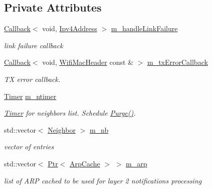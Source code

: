 \subsection*{Private Attributes}
\begin{DoxyCompactItemize}
\item 
\hyperlink{classns3_1_1Callback}{Callback}$<$ void, \hyperlink{classns3_1_1Ipv4Address}{Ipv4\+Address} $>$ \hyperlink{classns3_1_1aodv_1_1Neighbors_a9f8078f57932255c9fc05f6f3bcef8ab}{m\+\_\+handle\+Link\+Failure}
\begin{DoxyCompactList}\small\item\em link failure callback \end{DoxyCompactList}\item 
\hyperlink{classns3_1_1Callback}{Callback}$<$ void, \hyperlink{classns3_1_1WifiMacHeader}{Wifi\+Mac\+Header} const \& $>$ \hyperlink{classns3_1_1aodv_1_1Neighbors_ab0ff33bad83facfa8a2da7d932bd9953}{m\+\_\+tx\+Error\+Callback}
\begin{DoxyCompactList}\small\item\em TX error callback. \end{DoxyCompactList}\item 
\hyperlink{classns3_1_1Timer}{Timer} \hyperlink{classns3_1_1aodv_1_1Neighbors_a94dd235d692b8ff312b51654580530cd}{m\+\_\+ntimer}
\begin{DoxyCompactList}\small\item\em \hyperlink{classns3_1_1Timer}{Timer} for neighbor\textquotesingle{}s list. Schedule \hyperlink{classns3_1_1aodv_1_1Neighbors_a5db1238b20a700967e21ebb3522afc5c}{Purge()}. \end{DoxyCompactList}\item 
std\+::vector$<$ \hyperlink{structns3_1_1aodv_1_1Neighbors_1_1Neighbor}{Neighbor} $>$ \hyperlink{classns3_1_1aodv_1_1Neighbors_a885bb3a178f3583ed73e391d918f2f63}{m\+\_\+nb}
\begin{DoxyCompactList}\small\item\em vector of entries \end{DoxyCompactList}\item 
std\+::vector$<$ \hyperlink{classns3_1_1Ptr}{Ptr}$<$ \hyperlink{classns3_1_1ArpCache}{Arp\+Cache} $>$ $>$ \hyperlink{classns3_1_1aodv_1_1Neighbors_a6e0800b74469fc43603d2824a8dbb8e7}{m\+\_\+arp}
\begin{DoxyCompactList}\small\item\em list of A\+RP cached to be used for layer 2 notifications processing \end{DoxyCompactList}\end{DoxyCompactItemize}


